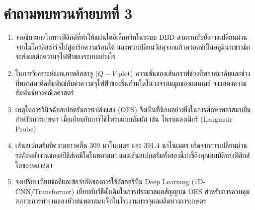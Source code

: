 \clearpage


\section*{คำถามทบทวนท้ายบทที่ 3}

\begin{enumerate}
    \item จงอธิบายกลไกทางฟิสิกส์ที่ทำให้แผ่นไดอิเล็กทริกในระบบ DBD สามารถยับยั้งการเปลี่ยนผ่านจากไมโครดิสชาร์จไปสู่อาร์กความร้อนได้ และหากเปลี่ยนวัสดุจากแก้วควอตซ์เป็นอลูมินาเซรามิกจะส่งผลต่อความจุไฟฟ้าของระบบอย่างไร
    \item ในการวิเคราะห์แผนภาพลิสซาจู ($Q-V$ plot) ความชันของเส้นกราฟช่วงที่พลาสมาดับและช่วงที่พลาสมาติดสัมพันธ์กับค่าความจุไฟฟ้าของชิ้นส่วนใดในวงจรสมมูลของแมนเลย์ จงแสดงความสัมพันธ์ทางคณิตศาสตร์
    \item เหตุใดการวินิจฉัยสเปกตรัมการเปล่งแสง (OES) จึงเป็นที่นิยมอย่างยิ่งในการศึกษาพลาสมาเย็นสำหรับการเกษตร เมื่อเทียบกับการใช้โพรบแบบสัมผัส เช่น โพรบแลงเมียร์ (Langmuir Probe)
    \item เส้นสเปกตรัมที่ความยาวคลื่น 309 นาโนเมตร และ 391.4 นาโนเมตร เกิดจากการเปลี่ยนผ่านระดับพลังงานของสปีชีส์เคมีใดในพลาสมา และเส้นสเปกตรัมทั้งสองนี้บ่งชี้ถึงคุณสมบัติทางฟิสิกส์ใดของพลาสมา
    \item จงเปรียบเทียบข้อดีและข้อจำกัดของการใช้อัลกอริทึม Deep Learning (1D-CNN/Transformer) เทียบกับวิธีดั้งเดิมในการประมวลผลสัญญาณ OES สำหรับการควบคุมสภาวะการทำงานของหัวพ่นพลาสมาเจ็ทในโรงงานบรรจุผลผลิตทางการเกษตร
\end{enumerate}

\clearpage
